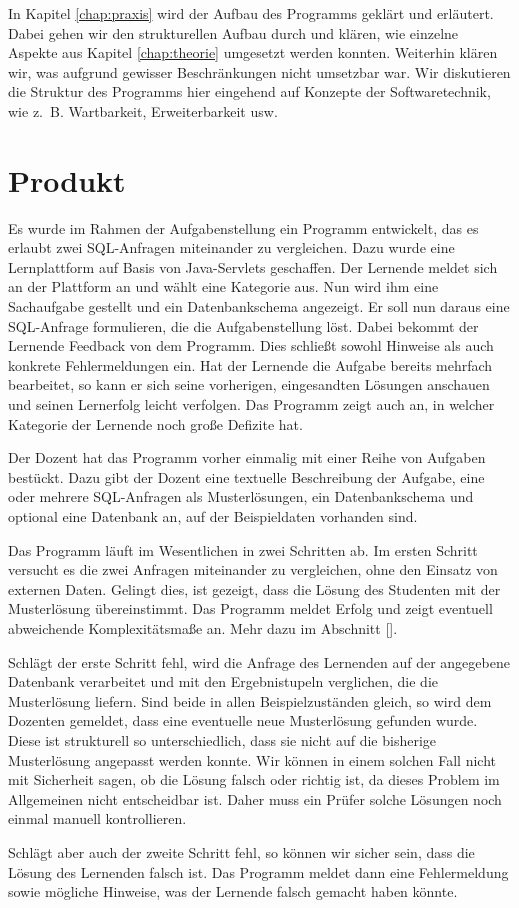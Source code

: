 In Kapitel \ref{chap:praxis} wird der Aufbau des Programms geklärt und erläutert. Dabei gehen wir den strukturellen Aufbau durch und klären, wie einzelne Aspekte aus Kapitel \ref{chap:theorie} umgesetzt werden konnten. Weiterhin klären wir, was aufgrund gewisser Beschränkungen nicht umsetzbar war. Wir diskutieren die Struktur des Programms hier eingehend auf Konzepte der Softwaretechnik, wie \mbox{z. B.} Wartbarkeit, Erweiterbarkeit usw.


\section{Produkt}

Es wurde im Rahmen der Aufgabenstellung ein Programm entwickelt, das es erlaubt zwei SQL-Anfragen miteinander zu vergleichen. Dazu wurde eine Lernplattform auf Basis von Java-Servlets geschaffen. Der Lernende meldet sich an der Plattform an und wählt eine Kategorie aus. Nun wird ihm eine Sachaufgabe gestellt und ein Datenbankschema angezeigt. Er soll nun daraus eine SQL-Anfrage formulieren, die die Aufgabenstellung löst. Dabei bekommt der Lernende Feedback von dem Programm. Dies schließt sowohl Hinweise als auch konkrete Fehlermeldungen ein. Hat der Lernende die Aufgabe bereits mehrfach bearbeitet, so kann er sich seine vorherigen, eingesandten Lösungen anschauen und seinen Lernerfolg leicht verfolgen. Das Programm zeigt auch an, in welcher Kategorie der Lernende noch große Defizite hat.

Der Dozent hat das Programm vorher einmalig mit einer Reihe von Aufgaben bestückt. Dazu gibt der Dozent eine textuelle Beschreibung der Aufgabe, eine oder mehrere SQL-Anfragen als Musterlösungen, ein Datenbankschema und optional eine Datenbank an, auf der Beispieldaten vorhanden sind. 

Das Programm läuft im Wesentlichen in zwei Schritten ab. Im ersten Schritt versucht es die zwei Anfragen miteinander zu vergleichen, ohne den Einsatz von externen Daten. Gelingt dies, ist gezeigt, dass die Lösung des Studenten mit der Musterlösung übereinstimmt. Das Programm meldet Erfolg und zeigt eventuell abweichende Komplexitätsmaße an. Mehr dazu im Abschnitt [].

Schlägt der erste Schritt fehl, wird die Anfrage des Lernenden auf der angegebene Datenbank verarbeitet und mit den Ergebnistupeln verglichen, die die Musterlösung liefern. Sind beide in allen Beispielzuständen gleich, so wird dem Dozenten gemeldet, dass eine eventuelle neue Musterlösung gefunden wurde. Diese ist strukturell so unterschiedlich, dass sie nicht auf die bisherige Musterlösung angepasst werden konnte. Wir können in einem solchen Fall nicht mit Sicherheit sagen, ob die Lösung falsch oder richtig ist, da dieses Problem im Allgemeinen nicht entscheidbar ist. Daher muss ein Prüfer solche Lösungen noch einmal manuell kontrollieren.

Schlägt aber auch der zweite Schritt fehl, so können wir sicher sein, dass die Lösung des Lernenden falsch ist. Das Programm meldet dann eine Fehlermeldung sowie mögliche Hinweise, was der Lernende falsch gemacht haben könnte.


